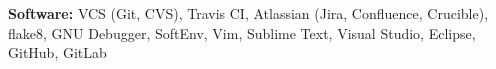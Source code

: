 

\vspace{5pt}

\textbf{Software:} VCS (Git, CVS), Travis CI, Atlassian (Jira, Confluence, Crucible), flake8, GNU Debugger, SoftEnv, Vim, Sublime Text, Visual Studio, Eclipse, GitHub, GitLab
